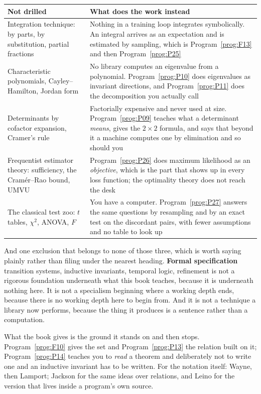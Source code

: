 \begin{center}
\begin{tabularx}{\linewidth}{@{}XX@{}}
\toprule
\textbf{Not drilled} & \textbf{What does the work instead} \\
\midrule
Integration technique: by parts, by substitution, partial fractions & Nothing
  in a training loop integrates symbolically. An integral arrives as an
  expectation and is estimated by sampling, which is Program~\ref{prog:F13}
  and then Program~\ref{prog:P25} \\
Characteristic polynomials, Cayley--Hamilton, Jordan form & No library computes
  an eigenvalue from a polynomial. Program~\ref{prog:P10} does eigenvalues as
  invariant directions, and Program~\ref{prog:P11} does the decomposition you
  actually call \\
Determinants by cofactor expansion, Cramer's rule & Factorially expensive and
  never used at size. Program~\ref{prog:P09} teaches what a determinant
  \emph{means}, gives the $2 \times 2$ formula, and says that beyond it a
  machine computes one by elimination and so should you \\
Frequentist estimator theory: sufficiency, the Cramér--Rao bound, UMVU &
  Program~\ref{prog:P26} does maximum likelihood as an \emph{objective}, which
  is the part that shows up in every loss function; the optimality theory does
  not reach the desk \\
The classical test zoo: $t$ tables, $\chi^{2}$, ANOVA, $F$ & You have a
  computer. Program~\ref{prog:P27} answers the same questions by resampling and
  by an exact test on the discordant pairs, with fewer assumptions and no table
  to look up \\
\bottomrule
\end{tabularx}
\end{center}

\medskip
And one exclusion that belongs to none of those three, which is worth saying
plainly rather than filing under the nearest heading. \textbf{Formal
specification} \dash{} transition systems, inductive invariants, temporal
logic, refinement \dash{} is not a rigorous foundation underneath what this
book teaches, because it is underneath nothing here. It is not a specialism
beginning where a working depth ends, because there is no working depth here
to begin from. And it is not a technique a library now performs, because the
thing it produces is a sentence rather than a computation.

What the book gives is the ground it stands on and then stops.
Program~\ref{prog:F10} gives the set and Program~\ref{prog:P13} the relation
built on it; Program~\ref{prog:P14} teaches you to \emph{read} a theorem and
deliberately not to write one \dash{} and an inductive invariant has to be
written. For the notation itself: Wayne, then Lamport; Jackson for the same
ideas over relations, and Leino for the version that lives inside a program's
own source.

